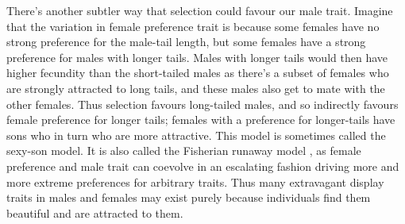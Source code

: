 There's another subtler way that selection could favour our male
trait. Imagine that the variation in female preference trait is
because some females have no strong preference for the male-tail
length, but some females have a strong preference for males with
longer tails. Males with longer tails would then have higher fecundity than
the short-tailed males as there's a subset of females who are strongly
attracted to long tails, and these males also get to mate with the
other females. Thus selection favours long-tailed males, and so indirectly favours
female preference for longer tails; females with a preference
for longer-tails have sons who in turn who are more attractive. This
model is sometimes called the sexy-son model. It is also called
the Fisherian runaway model \citep{fisher1915evolution}, as female
preference and male trait can coevolve in an escalating fashion
driving more and more extreme preferences for arbitrary traits. Thus
many extravagant display traits in males and females may exist purely
because individuals find them beautiful and are attracted to them. 






